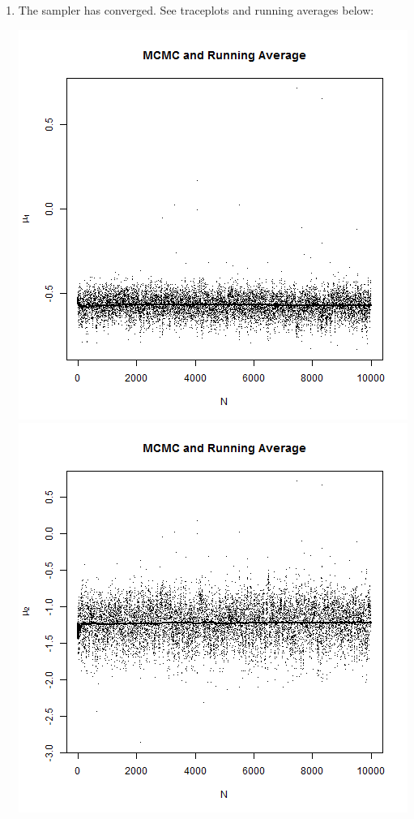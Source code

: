 \documentclass{article}
\begin{document}
\begin{enumerate}
\pagebreak
\item The sampler has converged. See traceplots and running averages below:

\includegraphics[scale = 0.4]{mu1.png}
\includegraphics[scale = 0.4]{mu2.png}\\

\end{enumerate}
\end{document}
